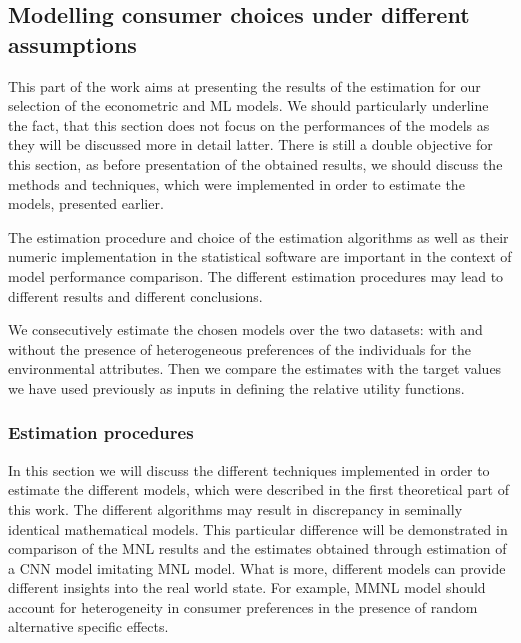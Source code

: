 \documentclass[11pt,]{article}
\title{}
\author{}
\date{}
\begin{document}
\hypertarget{modelling-consumer-choices-under-different-assumptions}{%
\subsection{Modelling consumer choices under different
assumptions}\label{modelling-consumer-choices-under-different-assumptions}}

This part of the work aims at presenting the results of the estimation
for our selection of the econometric and ML models. We should
particularly underline the fact, that this section does not focus on the
performances of the models as they will be discussed more in detail
latter. There is still a double objective for this section, as before
presentation of the obtained results, we should discuss the methods and
techniques, which were implemented in order to estimate the models,
presented earlier.

The estimation procedure and choice of the estimation algorithms as well
as their numeric implementation in the statistical software are
important in the context of model performance comparison. The different
estimation procedures may lead to different results and different
conclusions.

We consecutively estimate the chosen models over the two datasets: with
and without the presence of heterogeneous preferences of the individuals
for the environmental attributes. Then we compare the estimates with the
target values we have used previously as inputs in defining the relative
utility functions.

\hypertarget{estimation-procedures}{%
\subsubsection{Estimation procedures}\label{estimation-procedures}}

In this section we will discuss the different techniques implemented in
order to estimate the different models, which were described in the
first theoretical part of this work. The different algorithms may result
in discrepancy in seminally identical mathematical models. This
particular difference will be demonstrated in comparison of the MNL
results and the estimates obtained through estimation of a CNN model
imitating MNL model. What is more, different models can provide
different insights into the real world state. For example, MMNL model
should account for heterogeneity in consumer preferences in the presence
of random alternative specific effects.
\end{document}
